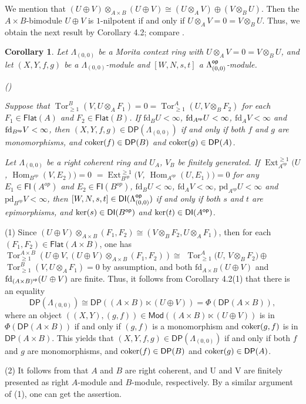 \documentclass[10pt,twoside]{amsart}
\theoremstyle{bfupright head,slanted body}
\theoremstyle{bfupright head,upright body}
\theoremstyle{fixed bf head,slanted body}
\newtheorem{cor}[res]{Corollary}        \newtheorem*{cor*}{Corollary}
\theoremstyle{fixed bf head,upright body}
\theoremstyle{numbered paragraph}
\newlength{\thmlistleft}        %
\newlength{\thmlistright}       %
\newlength{\thmlistpartopsep}   %
\newlength{\thmlisttopsep}      %
\newlength{\thmlistparsep}      %
\newlength{\thmlistitemsep}     %
\newcounter{rqm}
\newenvironment{rqm}{\begin{list}{\upshape (\arabic{rqm})}%
    {\usecounter{rqm}%
      \setlength{\leftmargin}{\thmlistleft}%
      \setlength{\labelwidth}{\thmlistleft}%
      \setlength{\rightmargin}{\thmlistright}%
      \setlength{\partopsep}{\thmlistpartopsep}%
      \setlength{\topsep}{\thmlisttopsep}%
      \setlength{\parsep}{\thmlistparsep}%
      \setlength{\itemsep}{\thmlistitemsep}}}%
  {\end{list}}%
\newenvironment{prf*}[1][Proof]{%
  \begin{proof}[\bf #1]
    \setcounter{equation}{0}
    \renewcommand{\theequation}{\arabic{equation}}}
  {\end{proof}
}
\numberwithin{equation}{res}
\newcommand{\DP}{\mathsf{DP}}
\newcommand{\DI}{\mathsf{DI}}
\newcommand{\fd}{\mathrm{fd}}
\newcommand{\pd}{\mathrm{pd}}
\newcommand{\Flat}{\mathsf{Flat}}
\newcommand{\FI}{\mathsf{FI}}
\newcommand{\Mod}{\mathsf{Mod}}
\newcommand{\op}{\sf op}
\newcommand{\cok}{\mbox{\rm coker}}
\newcommand{\kernel}{\mbox{\rm ker}}
\newcommand{\Hom}{\operatorname{Hom}}
\newcommand{\Ext}{\operatorname{Ext}}
\newcommand{\Tor}{\operatorname{Tor}}
\begin{document}
We mention that $(U \oplus V)\otimes_{A\times B}(U \oplus V) \cong (U\otimes_AV) \oplus (V\otimes_BU)$.
Then the $A\times B$-bimodule $U \oplus V$ is $1$-nilpotent if and only if $U\otimes_AV=0=V\otimes_BU$.
Thus, we obtain the next result by Corollary 4.2; compare \cite[Theorem 2.4 and 3.5]{2023Mao}.



\begin{cor} \label{con GP in morita ring}
Let $\Lambda_{(0,0)}$ be a Morita context ring with $U\otimes_AV=0=V\otimes_BU$, and let $(X,Y,f,g)$ be a $\Lambda_{(0,0)}$-module and $[W,N,s,t]$ a $\Lambda_{(0,0)}^{\op}$-module.
\begin{rqm}
\item
Suppose that $\Tor^B_{\geqslant 1}(V, U\otimes_A F_1)=0=\Tor^A_{\geqslant 1}(U, V\otimes_B F_2)$ for each $F_1 \in \Flat(A)$ and $F_2 \in \Flat(B)$. If $\fd_{B}U<\infty$, $\fd_{A^{\op}}U<\infty$, $\fd_{A}V<\infty$ and $\fd_{B^{\op}}V< \infty$, then $(X,Y,f,g)\in\DP(\Lambda_{(0,0)})$ if and only if
both $f$ and $g$ are monomorphisms, and $\cok(f)\in\DP(B)$ and $\cok(g)\in\DP(A)$. 
\item
Let $\Lambda_{(0,0)}$ be a right coherent ring and $U_{A}$, $V_{B}$ be finitely generated.
If $\Ext_{A^{op}}^{\geqslant 1}(U$, $\Hom_{B^{op}}(V, E_{2}))=0 $ 
$=\Ext_{B^{op}}^{\geqslant 1}(V$, $\Hom_{A^{op}}(U, E_{1}))=0 $
for any $E_{1}\in\FI(A^{op})$ and  $E_{2}\in\FI(B^{op})$, 
$\fd_{B}U<\infty$, $\fd_{A}V<\infty$, $\pd_{A^{op}}U<\infty$ and $\pd_{B^{op}}V<\infty$,
then $[W,N,s,t]\in\DI(\Lambda_{(0,0)}^{\op})$ if and only if both $s$ and $t$ are epimorphisms, and $\kernel(s)\in\DI(B^{\op})$ and $\kernel(t)\in\DI(A^{\op})$.
\end{rqm}
\end{cor}
\begin{prf*}
(1) Since $(U \oplus V)\otimes_{A\times B}(F_{1}, F_{2}) \cong (V\otimes_B F_{2},U\otimes_A F_{1})$,
then for each $(F_1, F_2) \in \Flat(A\times B)$, one has $\Tor^{A\times B}_{\geqslant 1}
(U \oplus V, (U \oplus V)\otimes_{A\times B}(F_1, F_2)) \cong$
$\Tor^{A}_{\geqslant 1}(U$, $V\otimes_B F_{2})\oplus$ $\Tor^{B}_{\geqslant 1}(V, U\otimes_A F_{1}) =0$
by assumption, and both $\fd_{A\times B}(U \oplus V)$ and $\fd_{{(A\times B)}^{\op}}(U \oplus V)$ are finite. 
Thus, it follows from Corollary 4.2(1) that there is an equality
$$
\DP(\Lambda_{(0,0)})
\cong \DP((A\times B)\ltimes (U \oplus V))
=\Phi(\DP(A\times B)),$$
where an object $((X,Y),(g,f))\in\Mod((A\times B)\ltimes (U \oplus V))$ is in $\Phi(\DP(A\times B))$ if and only if $(g,f)$ is a monomorphism and $\cok(g,f)$ is in $\DP(A\times B)$. This yields that $(X,Y,f,g)\in\DP(\Lambda_{(0,0)})$ if and only if
both $f$ and $g$ are monomorphisms, and $\cok(f)\in\DP(B)$ and $\cok(g)\in\DP(A)$.

(2) It follows from \cite[Corollary 4.7]{DL} that $A$ and $B$ are right coherent, 
and U and V are finitely presented as right $A$-module and $B$-module, respectively.
By a similar argument of (1), one can get the assertion.
\end{prf*}
\end{document}
